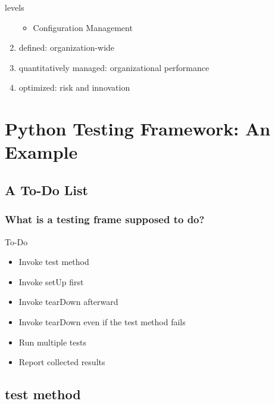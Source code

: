 \documentclass[lualatex]{beamer}
\begin{document}
\begin{frame}
\begin{block}{levels}
\begin{enumerate}
\begin{itemize}
      \item Configuration Management
      \end{itemize}
    \item defined: organization-wide
    \item quantitatively managed: organizational performance 
    \item optimized: risk and innovation 
    \end{enumerate}
  \end{block}
\end{frame}

\section[Testing Framework]{Python Testing Framework: An Example}

\subsection{A To-Do List}

\begin{frame}
    \frametitle{What is a testing frame supposed to do?}

    \begin{block}{To-Do}
        \begin{itemize}
            \item Invoke test method
            \item Invoke setUp first 
            \item Invoke tearDown afterward 
            \item Invoke tearDown even if the test method fails 
            \item Run multiple tests 
            \item Report collected results 
        \end{itemize}
    \end{block}
\end{frame}

\subsection{test method}
\end{document}

